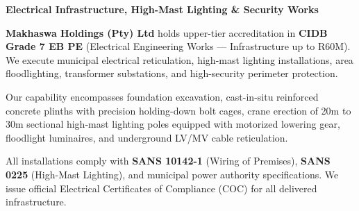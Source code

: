 \hypertarget{sec:electrical}{}

\noindent
\begin{minipage}[t]{0.62\textwidth}
    \vspace{0pt}
    {\large\bfseries\color{mhnavy} Electrical Infrastructure, High-Mast Lighting \& Security Works}
    \vspace{0.12cm}

    {\fontsize{9pt}{13pt}\selectfont\color{mhtext}
    \textbf{Makhaswa Holdings (Pty) Ltd} holds upper-tier accreditation in \textbf{CIDB Grade 7 EB PE} (Electrical Engineering Works --- Infrastructure up to R60M). We execute municipal electrical reticulation, high-mast lighting installations, area floodlighting, transformer substations, and high-security perimeter protection.
    }

    \vspace{0.22cm}

    {\fontsize{9pt}{13pt}\selectfont\color{mhtext}
    Our capability encompasses foundation excavation, cast-in-situ reinforced concrete plinths with precision holding-down bolt cages, crane erection of 20m to 30m sectional high-mast lighting poles equipped with motorized lowering gear, floodlight luminaires, and underground LV/MV cable reticulation.
    }

    \vspace{0.22cm}

    {\fontsize{9pt}{13pt}\selectfont\color{mhtext}
    All installations comply with \textbf{SANS 10142-1} (Wiring of Premises), \textbf{SANS 0225} (High-Mast Lighting), and municipal power authority specifications. We issue official Electrical Certificates of Compliance (COC) for all delivered infrastructure.
    }
\end{minipage}
\hfill
